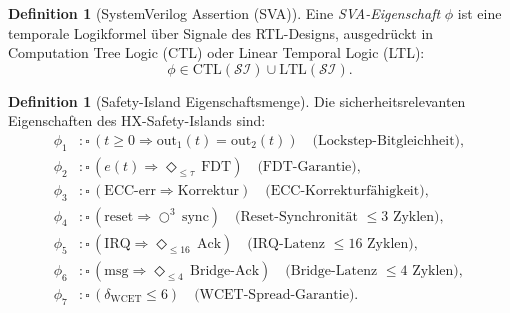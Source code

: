 ﻿\documentclass[a4paper,12pt]{article}
\theoremstyle{plain}
\theoremstyle{definition}
\newtheorem{definition}[theorem]{Definition}
\theoremstyle{remark}
\begin{document}
\begin{definition}[SystemVerilog Assertion (SVA)]\label{def:sva}
Eine \emph{SVA-Eigenschaft} $\phi$ ist eine temporale Logikformel
über Signale des RTL-Designs, ausgedrückt in
Computation Tree Logic (CTL) oder Linear Temporal Logic (LTL):
\[
  \phi \in \mathrm{CTL}(\mathcal{SI}) \cup \mathrm{LTL}(\mathcal{SI}).
\]
\end{definition}

\begin{definition}[Safety-Island Eigenschaftsmenge]\label{def:si_props}
Die sicherheitsrelevanten Eigenschaften des HX-Safety-Islands sind:
\begin{align}
  \phi_1 &: \square\,(t \geq 0 \Rightarrow \text{out}_1(t) = \text{out}_2(t))
            \quad\text{(Lockstep-Bitgleichheit)}, \label{eq:phi1}\\
  \phi_2 &: \square\,(e(t) \Rightarrow \Diamond_{\leq\tau}\,\mathrm{FDT})
            \quad\text{(FDT-Garantie)}, \label{eq:phi2}\\
  \phi_3 &: \square\,(\mathrm{ECC\text{-}err} \Rightarrow \mathrm{Korrektur})
            \quad\text{(ECC-Korrekturfähigkeit)}, \label{eq:phi3}\\
  \phi_4 &: \square\,(\mathrm{reset} \Rightarrow \bigcirc^3\,\mathrm{sync})
            \quad\text{(Reset-Synchronität $\leq 3$ Zyklen)}, \label{eq:phi4}\\
  \phi_5 &: \square\,(\mathrm{IRQ} \Rightarrow \Diamond_{\leq 16}\,\mathrm{Ack})
            \quad\text{(IRQ-Latenz $\leq 16$ Zyklen)}, \label{eq:phi5}\\
  \phi_6 &: \square\,(\mathrm{msg} \Rightarrow \Diamond_{\leq 4}\,\mathrm{Bridge\text{-}Ack})
            \quad\text{(Bridge-Latenz $\leq 4$ Zyklen)}, \label{eq:phi6}\\
  \phi_7 &: \square\,(\delta_\mathrm{WCET} \leq 6)
            \quad\text{(WCET-Spread-Garantie)}. \label{eq:phi7}
\end{align}
\end{definition}
\end{document}
